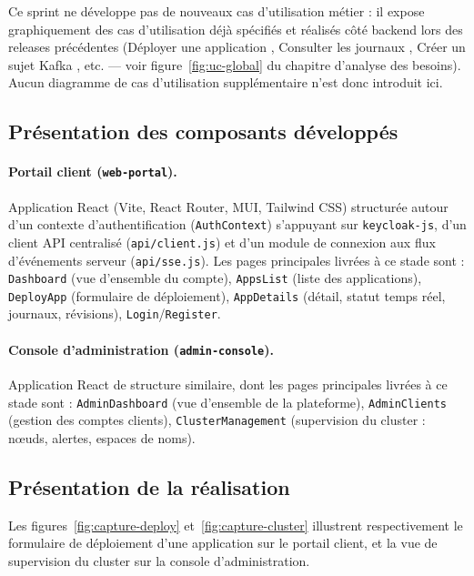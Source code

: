 Ce sprint ne développe pas de nouveaux cas d'utilisation métier : il expose graphiquement des cas d'utilisation déjà spécifiés et réalisés côté backend lors des releases précédentes (\og Déployer une application \fg{}, \og Consulter les journaux \fg{}, \og Créer un sujet Kafka \fg{}, etc. — voir figure~\ref{fig:uc-global} du chapitre d'analyse des besoins). Aucun diagramme de cas d'utilisation supplémentaire n'est donc introduit ici.

\subsection{Présentation des composants développés}

\paragraph{Portail client (\texttt{web-portal}).} Application React (Vite, React Router, MUI, Tailwind CSS) structurée autour d'un contexte d'authentification (\texttt{AuthContext}) s'appuyant sur \texttt{keycloak-js}, d'un client API centralisé (\texttt{api/client.js}) et d'un module de connexion aux flux d'événements serveur (\texttt{api/sse.js}). Les pages principales livrées à ce stade sont : \texttt{Dashboard} (vue d'ensemble du compte), \texttt{AppsList} (liste des applications), \texttt{DeployApp} (formulaire de déploiement), \texttt{AppDetails} (détail, statut temps réel, journaux, révisions), \texttt{Login}/\texttt{Register}.

\paragraph{Console d'administration (\texttt{admin-console}).} Application React de structure similaire, dont les pages principales livrées à ce stade sont : \texttt{AdminDashboard} (vue d'ensemble de la plateforme), \texttt{AdminClients} (gestion des comptes clients), \texttt{ClusterManagement} (supervision du cluster : nœuds, alertes, espaces de noms).

\subsection{Présentation de la réalisation}

Les figures~\ref{fig:capture-deploy} et~\ref{fig:capture-cluster} illustrent respectivement le formulaire de déploiement d'une application sur le portail client, et la vue de supervision du cluster sur la console d'administration.

